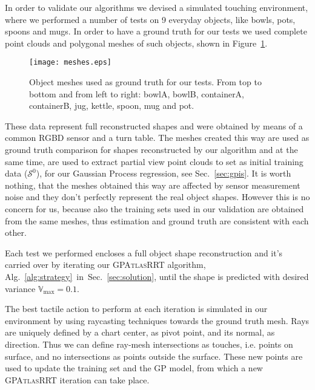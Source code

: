 
In order to validate our algorithms we devised a simulated touching environment,
where we performed a number of tests on 9 everyday objects, like bowls, pots, spoons and mugs.
In order to have a ground truth for our tests we used complete point clouds and polygonal meshes of
such objects, shown in Figure~\ref{fig:meshes}.

\begin{figure}[htb]
    \centering
    \texttt{[image: meshes.eps]}
    \caption{Object meshes used as ground truth for our tests. From top to bottom and from left
    to right: bowlA, bowlB, containerA, containerB, jug, kettle, spoon, mug and pot.}
    \label{fig:meshes}
\end{figure}

These data represent full reconstructed shapes and were obtained by means of a common RGBD sensor and a turn table. The meshes created this way are used as ground truth comparison for shapes reconstructed by our algorithm and at the same time, are used to extract partial view point clouds to set as initial training data ($\mathcal{S}^0$), for our Gaussian Process regression, see Sec.~\ref{sec:gpis}.
It is worth nothing, that the meshes obtained this way are affected by sensor measurement noise 
and they don't perfectly represent the real object shapes. However this is no concern for us, because also the
training sets used in our validation are obtained from the same meshes, thus estimation and ground truth are
consistent with each other.

Each test we performed encloses a full object shape reconstruction and it's carried over
by iterating our \textsc{GPAtlasRRT} algorithm, Alg.~\ref{alg:strategy}~in~Sec.~\ref{sec:solution},
until the shape is predicted with desired variance $\mathbb{V}_{\max} = 0.1$.

The best tactile action to perform at each iteration is simulated in our
environment by using  raycasting techniques towards the ground truth mesh.
Rays are uniquely defined by a chart center, as pivot point, and its normal, as direction.
Thus we can define  ray-mesh intersections as touches, i.e. points on surface, and no intersections
as points outside the surface. These new points are used to update the training set
and the GP model, from which a new \textsc{GPAtlasRRT} iteration can take place. 

